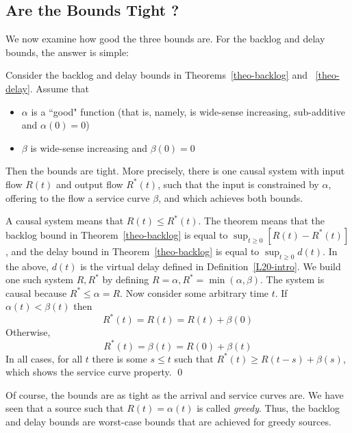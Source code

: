\subsection{Are the Bounds Tight ?}
We now examine how good the three bounds are. For the backlog and
delay bounds, the answer is simple:
\begin{theorem}
Consider the backlog and delay bounds in
Theorems~\ref{theo-backlog} and ~\ref{theo-delay}. Assume that
\begin{itemize}
  \item $\alpha$ is a ``good" function (that is, namely,
  is wide-sense increasing, sub-additive and $\alpha(0)=0$)
  \item $\beta$ is wide-sense increasing and  $\beta(0)=0$
\end{itemize}
Then the bounds are tight. More precisely, there is one causal
system with input flow $R(t)$ and output flow $R^*(t)$, such that
the input is constrained by $\alpha$, offering to the flow a
service curve $\beta$, and which achieves both bounds.
\end{theorem}
A causal system means that $R(t) \leq R^*(t)$. The theorem means
that the backlog bound in Theorem~\ref{theo-backlog} is equal to
  $\sup_{t \geq 0} [R(t)-R^*(t)]$,
  and the delay bound in Theorem~\ref{theo-backlog} is equal to
  $\sup_{t \geq 0} d(t)$.
In the above, $d(t)$ is the virtual delay defined in
Definition~\ref{L20-intro}.
\pr
We build one such system $R, R^*$ by defining $R=\alpha,
R^*=\min(\alpha, \beta)$. The system is causal because $R^*\leq
\alpha=R$. Now consider some arbitrary time $t$. If
$\alpha(t)<\beta(t)$ then $$R^*(t) = R(t) = R(t) + \beta(0)$$
Otherwise, $$R^*(t) =\beta(t)=R(0)+ \beta(t)$$ In all cases, for
all $t$ there is some $s\leq t$ such that $R^*(t) \geq R(t-s) +
\beta(s)$, which shows the service curve property. \qed

Of course, the bounds are as tight as the arrival and service
curves are. We have seen that a source such that $R(t)=\alpha(t)$
is called \emph{greedy}. Thus, the backlog and delay bounds are
worst-case bounds that are achieved for greedy sources.

